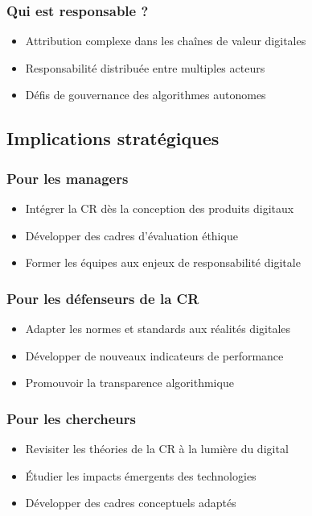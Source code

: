 \documentclass[12pt,a4paper]{article}
\begin{document}
\subsubsection{Qui est responsable ?}
\begin{itemize}
    \item Attribution complexe dans les chaînes de valeur digitales
    \item Responsabilité distribuée entre multiples acteurs
    \item Défis de gouvernance des algorithmes autonomes
\end{itemize}

\subsection{Implications stratégiques}

\subsubsection{Pour les managers}
\begin{itemize}
    \item Intégrer la CR dès la conception des produits digitaux
    \item Développer des cadres d'évaluation éthique
    \item Former les équipes aux enjeux de responsabilité digitale
\end{itemize}

\subsubsection{Pour les défenseurs de la CR}
\begin{itemize}
    \item Adapter les normes et standards aux réalités digitales
    \item Développer de nouveaux indicateurs de performance
    \item Promouvoir la transparence algorithmique
\end{itemize}

\subsubsection{Pour les chercheurs}
\begin{itemize}
    \item Revisiter les théories de la CR à la lumière du digital
    \item Étudier les impacts émergents des technologies
    \item Développer des cadres conceptuels adaptés
\end{itemize}
\end{document}

